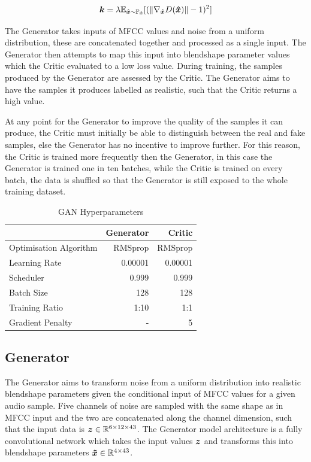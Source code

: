 \begin{equation}\label{eq:grad_penalty}
    {\boldsymbol{{k}}} = \lambda \mathbb{E}_{{\boldsymbol{{\hat{x}}}} \sim \mathbb{P}_{{\boldsymbol{{\hat{x}}}}}} 
            [(\| \nabla_{{\boldsymbol{{\hat{x}}}}} D({\boldsymbol{{\hat{x}}}}) \| - 1)^2]
\end{equation}

The Generator takes inputs of MFCC values and noise from a uniform distribution, these are concatenated together and processed as a single input.
The Generator then attempts to map this input into blendshape parameter values which the Critic evaluated to a low loss value. 
During training, the samples produced by the Generator are assessed by the Critic.
The Generator aims to have the samples it produces labelled as realistic, such that the Critic returns a high value.

At any point for the Generator to improve the quality of the samples it can produce, the Critic must initially be able to distinguish between the real and fake samples, else the Generator has no incentive to improve further.
For this reason, the Critic is trained more frequently then the Generator, in this case the Generator is trained one in ten batches, while the Critic is trained on every batch, the data is shuffled so that the Generator is still exposed to the whole training dataset.

\begin{table}[h!]
\centering
    \begin{tabular}{l | r | r}
    & \textbf{Generator} & \textbf{Critic}\\
    \hline
    Optimisation Algorithm & RMSprop & RMSprop \\
    Learning Rate          & 0.00001 & 0.00001 \\
    Scheduler              & 0.999   & 0.999   \\
    Batch Size             & 128     & 128     \\
    Training Ratio         & 1:10    & 1:1     \\
    Gradient Penalty       & -       & 5       \\
    \end{tabular} 
    \caption{GAN Hyperparameters}\label{table:gan_hyperparameters}
\end{table}

\subsection{Generator}
The Generator aims to transform noise from a uniform distribution into realistic blendshape parameters given the conditional input of MFCC values for a given audio sample.
Five channels of noise are sampled with the same shape as in MFCC input and the two are concatenated along the channel dimension, such that the input data is ${\boldsymbol{{z}}} \in \mathbb{R}^{6 \times 12 \times 43}$.
The Generator model architecture is a fully convolutional network which takes the input values ${\boldsymbol{{z}}}$ and transforms this into blendshape parameters ${\boldsymbol{{\tilde{x}}}} \in \mathbb{R}^{4 \times 43}$.

